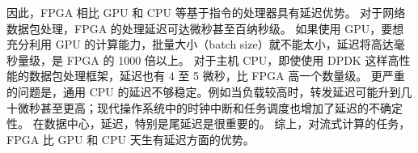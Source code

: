 因此，FPGA 相比 GPU 和 CPU 等基于指令的处理器具有延迟优势。
对于网络数据包处理，FPGA 的处理延迟可达微秒甚至百纳秒级。
如果使用 GPU，要想充分利用 GPU 的计算能力，批量大小（batch size）就不能太小，延迟将高达毫秒量级，是 FPGA 的 1000 倍以上。
对于主机 CPU，即使使用 DPDK 这样高性能的数据包处理框架，延迟也有 4 至 5 微秒，比 FPGA 高一个数量级。
更严重的问题是，通用 CPU 的延迟不够稳定。例如当负载较高时，转发延迟可能升到几十微秒甚至更高；现代操作系统中的时钟中断和任务调度也增加了延迟的不确定性。
在数据中心，延迟，特别是尾延迟是很重要的。
综上，对流式计算的任务，FPGA 比 GPU 和 CPU 天生有延迟方面的优势。









